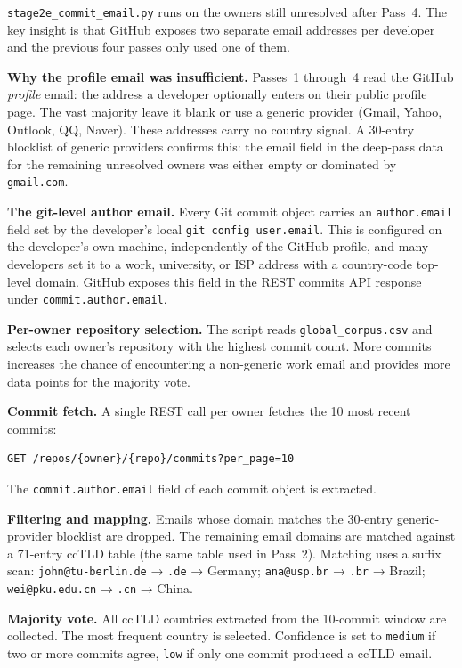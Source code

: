 \texttt{stage2e\_commit\_email.py} runs on the owners still unresolved after Pass~4. The key insight is that GitHub exposes two separate email addresses per developer and the previous four passes only used one of them.

\textbf{Why the profile email was insufficient.} Passes~1 through~4 read the GitHub \emph{profile} email: the address a developer optionally enters on their public profile page. The vast majority leave it blank or use a generic provider (Gmail, Yahoo, Outlook, QQ, Naver). These addresses carry no country signal. A 30-entry blocklist of generic providers confirms this: the email field in the deep-pass data for the remaining unresolved owners was either empty or dominated by \texttt{gmail.com}.

\textbf{The git-level author email.} Every Git commit object carries an \texttt{author.email} field set by the developer's local \texttt{git config user.email}. This is configured on the developer's own machine, independently of the GitHub profile, and many developers set it to a work, university, or ISP address with a country-code top-level domain. GitHub exposes this field in the REST commits API response under \texttt{commit.author.email}.

\textbf{Per-owner repository selection.} The script reads \texttt{global\_corpus.csv} and selects each owner's repository with the highest commit count. More commits increases the chance of encountering a non-generic work email and provides more data points for the majority vote.

\textbf{Commit fetch.} A single REST call per owner fetches the 10 most recent commits:
\begin{verbatim}
GET /repos/{owner}/{repo}/commits?per_page=10
\end{verbatim}
The \texttt{commit.author.email} field of each commit object is extracted.

\textbf{Filtering and mapping.} Emails whose domain matches the 30-entry generic-provider blocklist are dropped. The remaining email domains are matched against a 71-entry ccTLD table (the same table used in Pass~2). Matching uses a suffix scan: \texttt{john@tu-berlin.de} → \texttt{.de} → Germany; \texttt{ana@usp.br} → \texttt{.br} → Brazil; \texttt{wei@pku.edu.cn} → \texttt{.cn} → China.

\textbf{Majority vote.} All ccTLD countries extracted from the 10-commit window are collected. The most frequent country is selected. Confidence is set to \texttt{medium} if two or more commits agree, \texttt{low} if only one commit produced a ccTLD email.

